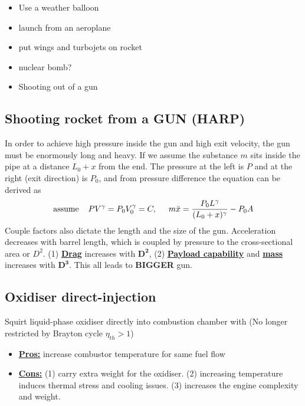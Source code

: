 \documentclass[a4paper,10pt]{article}
\begin{document}
\begin{multicols}{3}
\begin{itemize}
    \item Use a weather balloon
    \item launch from an aeroplane
    \item put wings and turbojets on rocket
    \item nuclear bomb?
    \item Shooting out of a gun
\end{itemize}
\end{multicols}

\subsection{Shooting rocket from a GUN (HARP)}
In order to achieve high pressure inside the gun and high exit velocity, the gun must be enormously long and heavy. If we assume the substance $m$ sits inside the pipe at a distance $L_0+x$ from the end. The pressure at the left is $P$ and at the right (exit direction) is $P_0$, and from pressure difference the equation can be derived as 
\begin{gather*}
    \text{assume}\hspace*{0.4cm}PV^\gamma = P_0V_0^\gamma = C,\hspace*{0.5cm}m\ddot{x} = \frac{P_0L^\gamma}{(L_0+x)^\gamma}-P_0A
\end{gather*} 
Couple factors also dictate the length and the size of the gun. Acceleration decreases with barrel length, which is coupled by pressure to the cross-sectional area or $D^2$. (1) \underline{\textbf{Drag}} increases with $\pmb{D^2}$, (2) \underline{\textbf{Payload capability}} and \underline{\textbf{mass}} increases with $\pmb{D^3}$. This all leads to \textbf{BIGGER} gun. 

\subsection{Oxidiser direct-injection}
Squirt liquid-phase oxidiser directly into combustion chamber with (No longer restricted by Brayton cycle $\eta_{th}>1$)
\begin{itemize}
    \item \underline{\textbf{Pros:}} increase combustor temperature for same fuel flow
    \item \underline{\textbf{Cons:}} (1) carry extra weight for the oxidiser. (2) increasing temperature induces thermal stress and cooling issues. (3) increases the engine complexity and weight. 
\end{itemize}
\end{document}
